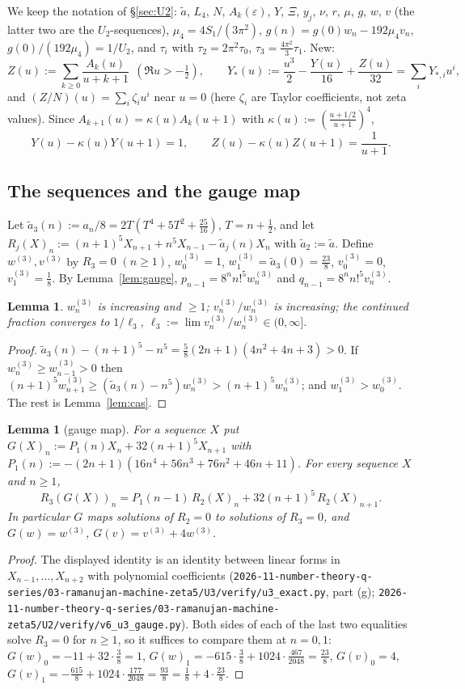 \documentclass[11pt]{amsart}
\newtheorem{lemma}[theorem]{Lemma}
\theoremstyle{definition}
\theoremstyle{remark}
\numberwithin{equation}{section}
\newcommand{\at}{\tilde a}
\newcommand{\file}[1]{\nolinkurl{2026-11-number-theory-q-series/03-ramanujan-machine-zeta5/#1}}
\begin{document}
We keep the notation of \S\ref{sec:U2}: $\at$, $L_4$, $N$, $A_k(\varepsilon)$, $Y$, $\Xi$, $y_j$, $\nu$, $r$, $\mu$, $g$, $w$, $v$ (the latter two are the $U_2$-sequences), $\mu_4=4S_1/(3\pi^2)$, $g(n)=g(0)w_n-192\mu_4v_n$, $g(0)/(192\mu_4)=1/U_2$, and $\tau_i$ with $\tau_2=2\pi^2\tau_0$, $\tau_3=\frac{4\pi^2}3\tau_1$. New:
\[
Z(u):=\sum_{k\ge0}\frac{A_k(u)}{u+k+1}\ \ (\Re u>-\tfrac12),\qquad Y_*(u):=\frac{u^3}2-\frac{Y(u)}{16}+\frac{Z(u)}{32}=\sum_iY_{*,i}u^i,
\]
and $(Z/N)(u)=\sum_i\zeta_iu^i$ near $u=0$ (here $\zeta_i$ are Taylor coefficients, not zeta values).
Since $A_{k+1}(u)=\kappa(u)A_k(u+1)$ with $\kappa(u):=(\frac{u+1/2}{u+1})^4$,
\begin{equation}\label{eq:shift}
Y(u)-\kappa(u)Y(u+1)=1,\qquad Z(u)-\kappa(u)Z(u+1)=\frac1{u+1}.
\end{equation}

\subsection{The sequences and the gauge map}
Let $\at_3(n):=a_n/8=2T(T^4+5T^2+\frac{25}{16})$, $T=n+\frac12$, and let $R_j(X)_n:=(n+1)^5X_{n+1}+n^5X_{n-1}-\at_j(n)X_n$ with $\at_2:=\at$. Define $w^{(3)},v^{(3)}$ by $R_3=0$ $(n\ge1)$, $w^{(3)}_0=1$, $w^{(3)}_1=\at_3(0)=\frac{23}8$, $v^{(3)}_0=0$, $v^{(3)}_1=\frac18$. By Lemma~\ref{lem:gauge}, $p_{n-1}=8^nn!^5w^{(3)}_n$ and $q_{n-1}=8^nn!^5v^{(3)}_n$.

\begin{lemma}\label{lem:U3conv}
$w^{(3)}_n$ is increasing and $\ge1$; $v^{(3)}_n/w^{(3)}_n$ is increasing; the continued fraction converges to $1/\ell_3$, $\ell_3:=\lim v^{(3)}_n/w^{(3)}_n\in(0,\infty]$.
\end{lemma}
\begin{proof}
$\at_3(n)-(n+1)^5-n^5=\frac58(2n+1)(4n^2+4n+3)>0$. If $w^{(3)}_n\ge w^{(3)}_{n-1}>0$ then $(n+1)^5w^{(3)}_{n+1}\ge(\at_3(n)-n^5)w^{(3)}_n>(n+1)^5w^{(3)}_n$; and $w^{(3)}_1>w^{(3)}_0$. The rest is Lemma~\ref{lem:cas}.
\end{proof}

\begin{lemma}[gauge map]\label{lem:gaugemap}
For a sequence $X$ put $G(X)_n:=P_1(n)X_n+32(n+1)^5X_{n+1}$ with $P_1(n):=-(2n+1)(16n^4+56n^3+76n^2+46n+11)$. For every sequence $X$ and $n\ge1$,
\[
R_3(G(X))_n=P_1(n-1)\,R_2(X)_n+32(n+1)^5\,R_2(X)_{n+1}.
\]
In particular $G$ maps solutions of $R_2=0$ to solutions of $R_3=0$, and $G(w)=w^{(3)}$, $G(v)=v^{(3)}+4w^{(3)}$.
\end{lemma}
\begin{proof}
The displayed identity is an identity between linear forms in $X_{n-1},\dots,X_{n+2}$ with polynomial coefficients (\file{U3/verify/u3_exact.py}, part (g); \file{U2/verify/v6_u3_gauge.py}). Both sides of each of the last two equalities solve $R_3=0$ for $n\ge1$, so it suffices to compare them at $n=0,1$: $G(w)_0=-11+32\cdot\frac38=1$, $G(w)_1=-615\cdot\frac38+1024\cdot\frac{467}{2048}=\frac{23}8$, $G(v)_0=4$, $G(v)_1=-\frac{615}8+1024\cdot\frac{177}{2048}=\frac{93}8=\frac18+4\cdot\frac{23}8$.
\end{proof}
\end{document}
